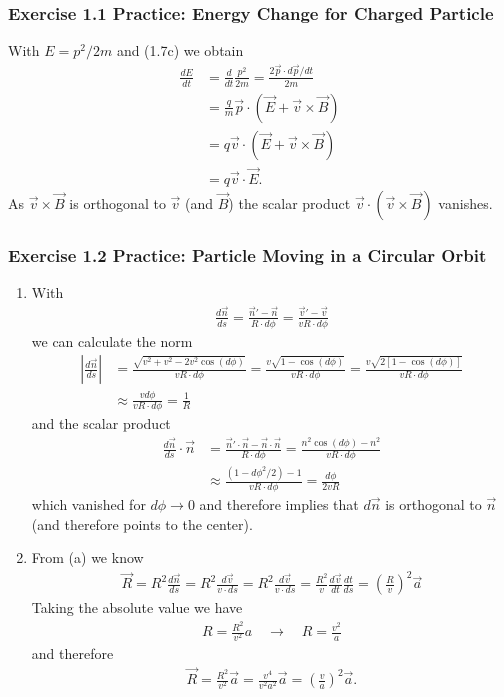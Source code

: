 \documentclass[10pt,a4paper]{book}
\theoremstyle{definition}
\begin{document}
\subsubsection{Exercise 1.1 Practice: Energy Change for Charged Particle}
With $E=p^2/2m$ and (1.7c) we obtain
\begin{align}
    \frac{dE}{dt}&=\frac{d}{dt}\frac{p^2}{2m}=\frac{2 \vec{p}\cdot d\vec{p}/dt}{2m}\\
    &=\frac{q}{m}\vec{p}\cdot (\vec{E}+\vec{v}\times\vec{B})\\
    &=q\vec{v}\cdot (\vec{E}+\vec{v}\times\vec{B})\\
    &=q\vec{v}\cdot\vec{E}.
\end{align}
As $\vec{v}\times\vec{B}$ is orthogonal to $\vec{v}$ (and $\vec{B}$) the scalar product $\vec{v}\cdot(\vec{v}\times\vec{B})$ vanishes.

\subsubsection{Exercise 1.2 Practice: Particle Moving in a Circular Orbit}
\begin{enumerate}[label=(\alph*)]
\item With
\begin{align}
    \frac{d\vec{n}}{ds}
    =\frac{\vec{n}'-\vec{n}}{R\cdot d\phi}=\frac{\vec{v}'-\vec{v}}{vR\cdot d\phi}
\end{align}
we can calculate the norm
\begin{align}
    \left|\frac{d\vec{n}}{ds}\right|
    &=\frac{\sqrt{v^2+v^2-2v^2\cos(d\phi)}}{vR\cdot d\phi}
    =\frac{v\sqrt{1-\cos(d\phi)}}{vR\cdot d\phi}
    = \frac{v\sqrt{2[1-\cos(d\phi)]}}{vR\cdot d\phi}\\
    &\approx\frac{vd\phi}{vR\cdot d\phi}=\frac{1}{R}
\end{align}
and the scalar product
\begin{align}
    \frac{d\vec{n}}{ds}\cdot\vec{n}
    &=\frac{\vec{n}'\cdot\vec{n}-\vec{n}\cdot\vec{n}}{R\cdot d\phi}=\frac{n^2\cos(d\phi)-n^2}{vR\cdot d\phi}\\
    &\approx \frac{(1-d\phi^2/2)-1}{vR\cdot d\phi}=\frac{d\phi}{2vR}
\end{align}
which vanished for $d\phi\rightarrow0$ and therefore implies that $d\vec{n}$ is orthogonal to $\vec{n}$ (and therefore points to the center).
\item From (a) we know
\begin{align}
    \vec{R}=R^2\frac{d\vec{n}}{ds}
    =R^2\frac{d\vec{v}}{v\cdot ds}
    =R^2\frac{d\vec{v}}{v\cdot ds}
    =\frac{R^2}{v}\frac{d\vec{v}}{dt}\frac{dt}{ds}
    =\left(\frac{R}{v}\right)^2\vec{a}
\end{align}
Taking the absolute value we have
\begin{align}
    R=\frac{R^2}{v^2}a\quad\rightarrow\quad R=\frac{v^2}{a}
\end{align}
and therefore
\begin{align}
    \vec{R}=\frac{R^2}{v^2}\vec{a}=\frac{v^4}{v^2 a^2}\vec{a}=\left(\frac{v}{a}\right)^2\vec{a}.
\end{align}
\end{enumerate}
\end{document}

